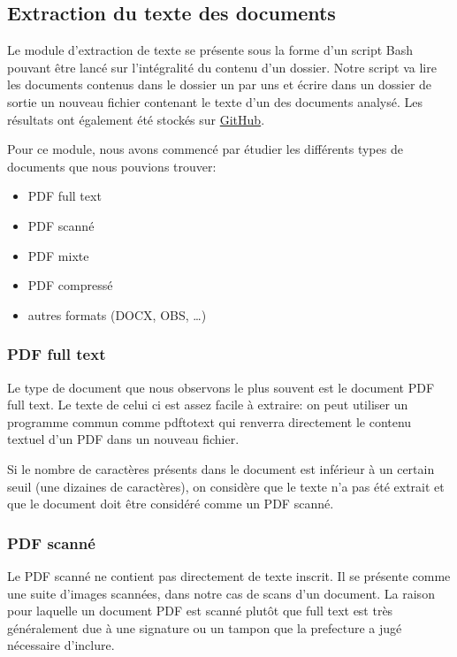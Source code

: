 
\subsection{Extraction du texte des documents}
Le module d'extraction de texte se présente sous la forme d'un script Bash pouvant être lancé sur l'intégralité du contenu d'un dossier.
Notre script va lire les documents contenus dans le dossier un par uns et écrire dans un dossier de sortie un nouveau fichier contenant le texte d'un des documents analysé.
Les résultats ont également été stockés sur \href{https://github.com/smallito/PFE/tree/master/codes/transcripts}{GitHub}.

Pour ce module, nous avons commencé par étudier les différents types de documents que nous pouvions trouver:
\begin{itemize}
\item PDF full text
\item PDF scanné
\item PDF mixte
\item PDF compressé
\item autres formats (DOCX, OBS, \ldots)
\end{itemize}

\subsubsection{PDF full text}
Le type de document que nous observons le plus souvent est le document PDF full text.
Le texte de celui ci est assez facile à extraire: on peut utiliser un programme commun comme pdftotext qui renverra directement le contenu textuel d'un PDF dans un nouveau fichier.

Si le nombre de caractères présents dans le document est inférieur à un certain seuil (une dizaines de caractères), on considère que le texte n'a pas été extrait et que le document doit être considéré comme un PDF scanné.

\subsubsection{PDF scanné}
Le PDF scanné ne contient pas directement de texte inscrit.
Il se présente comme une suite d'images scannées, dans notre cas de scans d'un document.
La raison pour laquelle un document PDF est scanné plutôt que full text est très généralement due à une signature ou un tampon que la prefecture a jugé nécessaire d'inclure.


